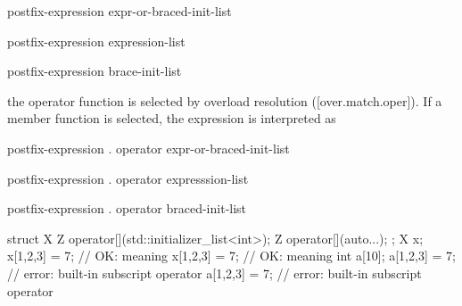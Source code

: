 \documentclass{wg21}
\begin{document}
\begin{removedblock}
\begin{ncsimplebnf}
    postfix-expression \terminal{[} expr-or-braced-init-list \terminal{]}
\end{ncsimplebnf}
\end{removedblock}

\begin{addedblock}
\begin{ncsimplebnf}
    postfix-expression \terminal{[}  expression-list \terminal{]}
    
    postfix-expression \terminal{[}  brace-init-list  \terminal{]}
\end{ncsimplebnf}
\end{addedblock}

the operator function is selected by overload resolution ([over.match.oper]).
If a member function is selected, the expression is
interpreted as

\begin{removedblock}
\begin{ncsimplebnf}
    postfix-expression . operator \terminal{[}\terminal{]} \terminal{(} expr-or-braced-init-list \terminal{)}
\end{ncsimplebnf}
\end{removedblock}

\begin{addedblock}
\begin{ncsimplebnf}
     postfix-expression . operator \terminal{[}\terminal{]} \terminal{(} expresssion-list \terminal{)}

      postfix-expression . operator \terminal{[}\terminal{]} \terminal{(}
      braced-init-list  \terminal{)}
\end{ncsimplebnf}
\end{addedblock}

\pnum
\begin{example}
\begin{codeblock}
    struct X {
        Z operator[](std::initializer_list<int>);
        Z operator[](auto...);
    };
    X x;
    x[{1,2,3}] = 7;                 // OK: meaning 
    x[1,2,3] = 7;                   // OK: meaning 
    int a[10];
    a[{1,2,3}] = 7;                 // error: built-in subscript operator
    a[1,2,3] = 7;                   // error: built-in subscript operator
\end{codeblock}
\end{example}
\end{document}
